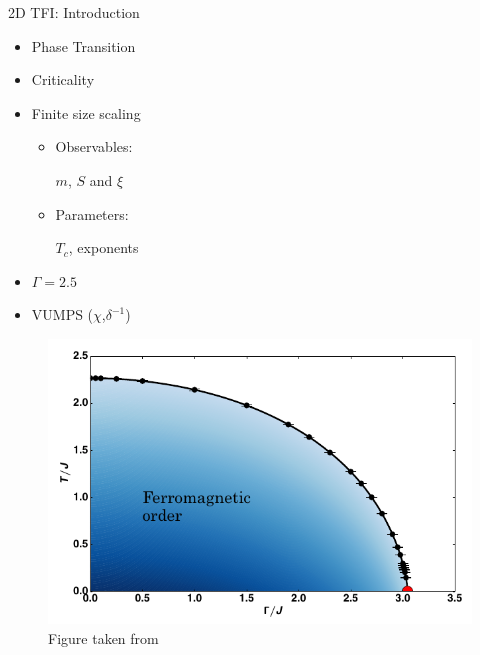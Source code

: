 \begin{frame}{2D TFI: Introduction}
    \begin{minipage}{0.35\textwidth}
        \begin{itemize}
            \item Phase Transition
            \item Criticality
            \item Finite size scaling
                  \begin{itemize}
                      \item Observables:

                            $m$, $S$ and $\xi$
                      \item Parameters:

                            $T_c$, exponents
                  \end{itemize}
            \item $\Gamma=2.5$
            \item VUMPS ($\chi$,$\delta^{-1}$)
        \end{itemize}
    \end{minipage}
    \begin{minipage}{0.64\textwidth}
        \begin{figure}
            \centering
            \includegraphics[width=\linewidth]{../Figuren/phsyics/2disingphase.png}
            \caption*{Figure taken from \cite{Hesselmann2016}  }
        \end{figure}
    \end{minipage}
\end{frame}

